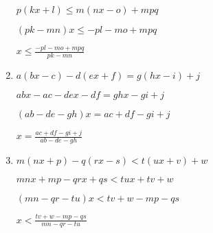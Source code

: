 \documentclass[10pt]{exam}
\begin{document}
\begin{multicols*}{2}
\begin{enumerate}
\( p(kx + l) \leq m(nx - o) + mpq \)

\( (pk - mn)x \leq -pl - mo + mpq \)

\(\displaystyle x \leq \frac{-pl - mo + mpq}{pk - mn} \)

\item \( a(bx - c) - d(ex + f) = g(hx - i) + j \)

\( abx - ac - dex - df = ghx - gi + j \)

\( (ab - de - gh)x = ac + df - gi + j \)

\(\displaystyle x = \frac{ac + df - gi + j}{ab - de - gh} \)

\item \( m(nx + p) - q(rx - s) < t(ux + v) + w \)

\( mnx + mp - qrx + qs < tux + tv + w \)

\( (mn - qr - tu)x < tv + w - mp - qs \)

\(\displaystyle x < \frac{tv + w - mp - qs}{mn - qr - tu} \)

\end{enumerate}
\end{multicols*}
\end{document}
